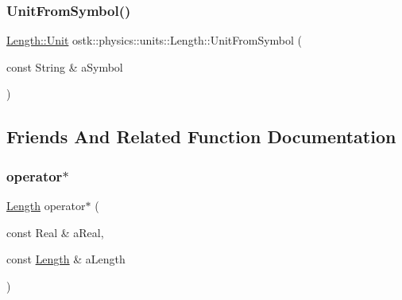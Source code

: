 \mbox{\label{classostk_1_1physics_1_1units_1_1_length_a91418e40747b13b0e2b669ec55626afa}} 
\subsubsection{\texorpdfstring{Unit\+From\+Symbol()}{UnitFromSymbol()}}
{\footnotesize\ttfamily \hyperlink{classostk_1_1physics_1_1units_1_1_length_a2664470a7eedf5d45c88861fe69badea}{Length\+::\+Unit} ostk\+::physics\+::units\+::\+Length\+::\+Unit\+From\+Symbol (\begin{DoxyParamCaption}\item[{const String \&}]{a\+Symbol }\end{DoxyParamCaption})\hspace{0.3cm}{\ttfamily [static]}}



\subsection{Friends And Related Function Documentation}
\mbox{\label{classostk_1_1physics_1_1units_1_1_length_a72059ec2f1e930a0e75a3a808e434363}} 
\subsubsection{\texorpdfstring{operator$\ast$}{operator*}}
{\footnotesize\ttfamily \hyperlink{classostk_1_1physics_1_1units_1_1_length}{Length} operator$\ast$ (\begin{DoxyParamCaption}\item[{const Real \&}]{a\+Real,  }\item[{const \hyperlink{classostk_1_1physics_1_1units_1_1_length}{Length} \&}]{a\+Length }\end{DoxyParamCaption})\hspace{0.3cm}{\ttfamily [friend]}}

